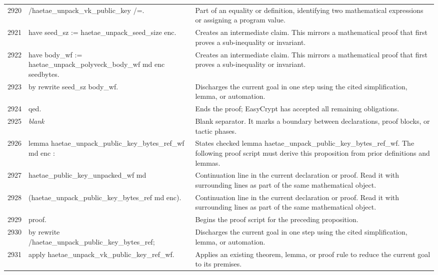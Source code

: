 \documentclass[10pt]{article}
\begin{document}
\begin{longtable}{r L{0.53\textwidth} L{0.37\textwidth}}
2920 & {\ttfamily\scriptsize         /haetae\_unpack\_vk\_public\_key /=.} & Part of an equality or definition, identifying two mathematical expressions or assigning a program value. \\
2921 & {\ttfamily\scriptsize have seed\_sz := haetae\_unpack\_seed\_size enc.} & Creates an intermediate claim.  This mirrors a mathematical proof that first proves a sub-inequality or invariant. \\
2922 & {\ttfamily\scriptsize have body\_wf := haetae\_unpack\_polyveck\_body\_wf md enc seedbytes.} & Creates an intermediate claim.  This mirrors a mathematical proof that first proves a sub-inequality or invariant. \\
2923 & {\ttfamily\scriptsize by rewrite seed\_sz body\_wf.} & Discharges the current goal in one step using the cited simplification, lemma, or automation. \\
2924 & {\ttfamily\scriptsize qed.} & Ends the proof; EasyCrypt has accepted all remaining obligations. \\
2925 & {\ttfamily\scriptsize \emph{blank}} & Blank separator.  It marks a boundary between declarations, proof blocks, or tactic phases. \\
2926 & {\ttfamily\scriptsize lemma haetae\_unpack\_public\_key\_bytes\_ref\_wf md enc :} & States checked lemma haetae\_unpack\_public\_key\_bytes\_ref\_wf.  The following proof script must derive this proposition from prior definitions and lemmas. \\
2927 & {\ttfamily\scriptsize   haetae\_public\_key\_unpacked\_wf md} & Continuation line in the current declaration or proof.  Read it with surrounding lines as part of the same mathematical object. \\
2928 & {\ttfamily\scriptsize     (haetae\_unpack\_public\_key\_bytes\_ref md enc).} & Continuation line in the current declaration or proof.  Read it with surrounding lines as part of the same mathematical object. \\
2929 & {\ttfamily\scriptsize proof.} & Begins the proof script for the preceding proposition. \\
2930 & {\ttfamily\scriptsize by rewrite /haetae\_unpack\_public\_key\_bytes\_ref;} & Discharges the current goal in one step using the cited simplification, lemma, or automation. \\
2931 & {\ttfamily\scriptsize    apply haetae\_unpack\_vk\_public\_key\_ref\_wf.} & Applies an existing theorem, lemma, or proof rule to reduce the current goal to its premises. \\

\end{longtable}
\end{document}
